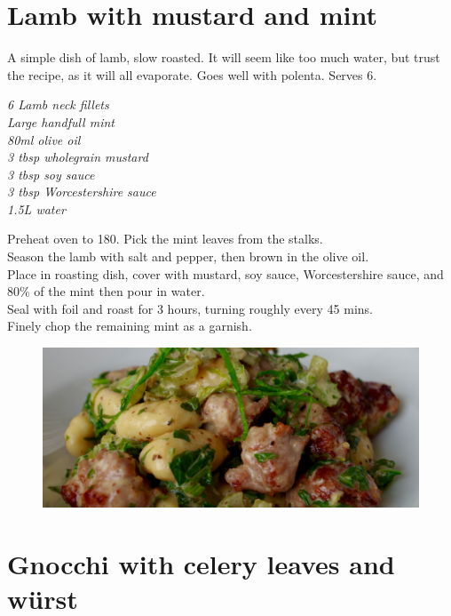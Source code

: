 \documentclass{tufte-book}
\begin{document}
\section{Lamb with mustard and mint}

A simple dish of lamb, slow roasted. It will seem like too much water, but trust the recipe, as it will all evaporate. Goes well with polenta. Serves 6.

\smallskip
\emph{6 Lamb neck fillets
\\Large handfull mint
\\80ml olive oil
\\3 tbsp wholegrain mustard
\\3 tbsp soy sauce
\\3 tbsp Worcestershire sauce
\\1.5L water}

\smallskip
Preheat oven to 180\celsius. Pick the mint leaves from the stalks. 
\\Season the lamb with salt and pepper, then brown in the olive oil.
\\Place in roasting dish, cover with mustard, soy sauce, Worcestershire sauce, and 80\% of the mint then pour in water. 
\\Seal with foil and roast for 3 hours, turning roughly every 45 mins.
\\Finely chop the remaining mint as a garnish.

\newpage

\begin{figure}[h]
  \includegraphics[width=\linewidth]{gnocchi.png}
\end{figure}

\section{Gnocchi with celery leaves and w{\"u}rst}
\end{document}

